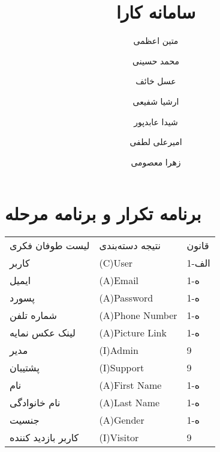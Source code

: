 \documentclass[12pt]{article}
\author{متین اعظمی}
\author{محمد حسینی}
\author{عسل خائف}
\author{ارشیا شفیعی}
\author{شیدا عابدپور}
\author{امیرعلی لطفی}
\author{زهرا معصومی}
\title{سامانه کارا}
\begin{document}
	
	\section{برنامه تکرار و برنامه مرحله}
	
	\begin{table}[]
		\begin{tabular}{lll}
			لیست طوفان فکری                      & نتیجه دسته‌بندی                                                                                               & قانون \\
			کاربر‌                               & (C)User                                                                                                       & 1-الف \\
			ایمیل                                & (A)Email                                                                                                      & 1-ه   \\
			پسورد                                & (A)Password                                                                                                   & 1-ه   \\
			شماره تلفن                           & (A)Phone Number                                                                                               & 1-ه   \\
			لینک عکس نمایه                       & (A)Picture Link                                                                                               & 1-ه   \\
			مدیر                                 & (I)Admin                                                                                                      & 9     \\
			پشتیبان                              & (I)Support                                                                                                    & 9     \\
			نام                                  & (A)First Name                                                                                                 & 1-ه   \\
			نام خانوادگی                         & (A)Last Name                                                                                                  & 1-ه   \\
			جنسیت                                & (A)Gender                                                                                                     & 1-ه   \\
			کاربر بازدید کننده                   & (I)Visitor                                                                                                    & 9     \\

\end{tabular}
\end{table}
\end{document}
